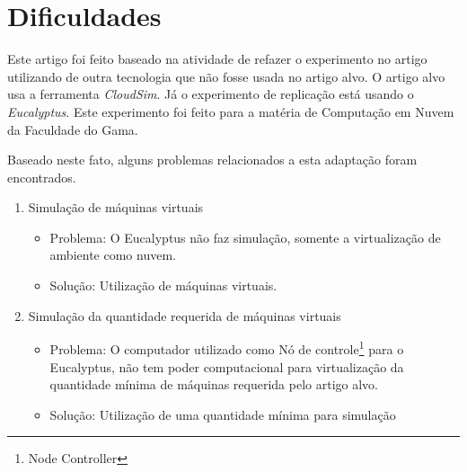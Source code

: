 \section{Dificuldades}

Este artigo foi feito baseado na atividade de refazer o experimento no artigo \cite{elaine_et_al:14} utilizando de outra tecnologia que não fosse usada no artigo alvo. O artigo alvo usa a ferramenta \textit{CloudSim}. Já o experimento de replicação está usando o \textit{Eucalyptus}. Este experimento foi feito para a matéria de Computação em Nuvem da Faculdade do Gama.

Baseado neste fato, alguns problemas relacionados a esta adaptação foram encontrados.

\begin{enumerate}

  \item Simulação de máquinas virtuais
  \begin{itemize}
    \item Problema: O Eucalyptus não faz simulação, somente a virtualização de ambiente como nuvem.
    \item Solução: Utilização de máquinas virtuais.
  \end{itemize}

  \item Simulação da quantidade requerida de máquinas virtuais
  \begin{itemize}
    \item Problema: O computador utilizado como Nó de controle\footnote{Node Controller} para o Eucalyptus, não tem poder computacional para virtualização da quantidade mínima de máquinas requerida pelo artigo alvo.
    \item Solução: Utilização de uma quantidade mínima para simulação
  \end{itemize}


\end{enumerate}
